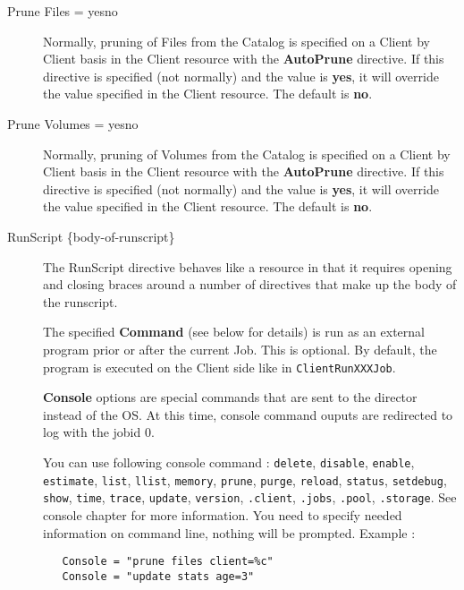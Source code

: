 \begin{description}
\item [Prune Files = \lt{}yes\vb{}no\gt{}]
   Normally, pruning of Files from the Catalog is specified on a Client by
   Client basis in the Client resource with the {\bf AutoPrune} directive.
   If this directive is specified (not normally) and the value is {\bf
   yes}, it will override the value specified in the Client resource.  The
   default is {\bf no}.

\item [Prune Volumes = \lt{}yes\vb{}no\gt{}]
   Normally, pruning of Volumes from the Catalog is specified on a Client
   by Client basis in the Client resource with the {\bf AutoPrune}
   directive.  If this directive is specified (not normally) and the value
   is {\bf yes}, it will override the value specified in the Client
   resource.  The default is {\bf no}.

\item [RunScript \{\lt{}body-of-runscript\gt{}\}]

   The RunScript directive behaves like a resource in that it
   requires opening and closing braces around a number of directives
   that make up the body of the runscript.

   The specified {\bf Command} (see below for details) is run as an external
   program prior or after the current Job.  This is optional.  By default, the
   program is executed on the Client side like in \texttt{ClientRunXXXJob}.

   \textbf{Console} options are special commands that are sent to the director instead
   of the OS. At this time, console command ouputs are redirected to log with
   the jobid 0.

   You can use following console command : \texttt{delete}, \texttt{disable},
   \texttt{enable}, \texttt{estimate}, \texttt{list}, \texttt{llist},
   \texttt{memory}, \texttt{prune}, \texttt{purge}, \texttt{reload},
   \texttt{status}, \texttt{setdebug}, \texttt{show}, \texttt{time},
   \texttt{trace}, \texttt{update}, \texttt{version}, \texttt{.client},
   \texttt{.jobs}, \texttt{.pool}, \texttt{.storage}.  See console chapter for
   more information. You need to specify needed information on command line, nothing
   will be prompted. Example :

\begin{verbatim}
   Console = "prune files client=%c"
   Console = "update stats age=3"
\end{verbatim}


\end{description}
